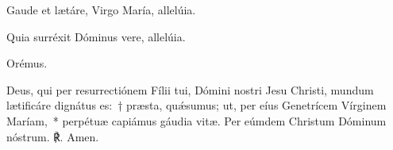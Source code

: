 
\noindent \vv Gaude et lætáre, Virgo María, allelúia.

\noindent \rr Quia surréxit Dóminus vere, allelúia.

Orémus.

\noindent Deus, qui per resurrectiónem Fílii tui, Dómini nostri Jesu Christi, mundum lætificáre dignátus es:~† præsta, quǽsumus; ut, per eíus Genetrícem Vírginem Maríam,~* perpétuæ capiámus gáudia vitæ. Per eúmdem Christum Dóminum nóstrum.  ℟. Amen.